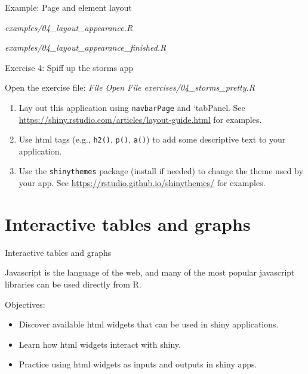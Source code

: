 \documentclass[
  12pt,
  ignorenonframetext,
]{beamer}
\providecommand{\tightlist}{%
  \setlength{\itemsep}{0pt}\setlength{\parskip}{0pt}}
\begin{document}
\begin{frame}{Example: Page and element layout}
\protect\hypertarget{example-page-and-element-layout}{}

\begin{description}
\tightlist
\item[Start]
\emph{examples/04\_layout\_appearance.R}
\item[Finished]
\emph{examples/04\_layout\_appearance\_finished.R}
\end{description}

\end{frame}

\begin{frame}[fragile]{Exercise 4: Spiff up the storms app}
\protect\hypertarget{exercise-4-spiff-up-the-storms-app}{}

Open the exercise file: \emph{File \rightarrow Open File
\rightarrow exercises/04\_storms\_pretty.R}

\begin{enumerate}
\item
  Lay out this application using \texttt{navbarPage} and `tabPanel. See
  \url{https://shiny.rstudio.com/articles/layout-guide.html} for
  examples.
\item
  Use html tags (e.g., \texttt{h2()}, \texttt{p()}, \texttt{a()}) to add
  some descriptive text to your application.
\item
  Use the \texttt{shinythemes} package (install if needed) to change the
  theme used by your app. See
  \url{https://rstudio.github.io/shinythemes/} for examples.
\end{enumerate}

\end{frame}

\hypertarget{interactive-tables-and-graphs}{%
\section{Interactive tables and
graphs}\label{interactive-tables-and-graphs}}

\begin{frame}{Interactive tables and graphs}

Javascript is the language of the web, and many of the most popular
javascript libraries can be used directly from R.

Objectives:

\begin{itemize}
\item
  Discover available html widgets that can be used in shiny
  applications.
\item
  Learn how html widgets interact with shiny.
\item
  Practice using html widgets as inputs and outputs in shiny apps.
\end{itemize}

\end{frame}
\end{document}
